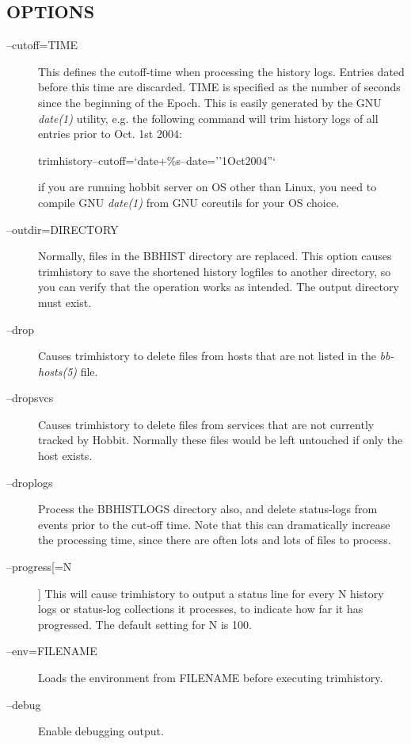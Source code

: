  
\subsection{OPTIONS}
\begin{description}
\item[--cutoff=TIME] This defines the cutoff-time when processing the
  history logs. Entries dated before this time are discarded. TIME is
  specified as the number of seconds since the beginning of the
  Epoch. This is easily generated by the GNU \emph{date(1)} utility,
  e.g. the following command will trim history logs of all entries
  prior to Oct. 1st 2004:  

  
trimhistory--cutoff=`date+\%s--date=''1Oct2004''` 

  if you are running hobbit server on OS other than Linux, you need to 
  compile GNU \emph{date(1)} from GNU coreutils for your OS choice.

\item[--outdir=DIRECTORY] Normally, files in the BBHIST directory are
  replaced. This option causes trimhistory to save the shortened
  history logfiles to another directory, so you can verify that the
  operation works as intended. The output directory must exist. 


 

\item[--drop] Causes trimhistory to delete files from hosts that are
  not listed in the \emph{bb-hosts(5)} file. 

 

\item[--dropsvcs] Causes trimhistory to delete files from services
  that are not currently tracked by Hobbit. Normally these files would
  be left untouched if only the host exists. 

 

\item[--droplogs] Process the BBHISTLOGS directory also, and delete
  status-logs from events prior to the cut-off time. Note that this
  can dramatically increase the processing time, since there are often
  lots and lots of files to process. 


 

\item[--progress[=N]] This will cause trimhistory to output a status
  line for every N history logs or status-log collections it
  processes, to indicate how far it has progressed. The default
  setting for N is 100. 


 

\item[--env=FILENAME] Loads the environment from FILENAME before executing trimhistory. 

 

\item[--debug] Enable debugging output. 

 
\end{description}
